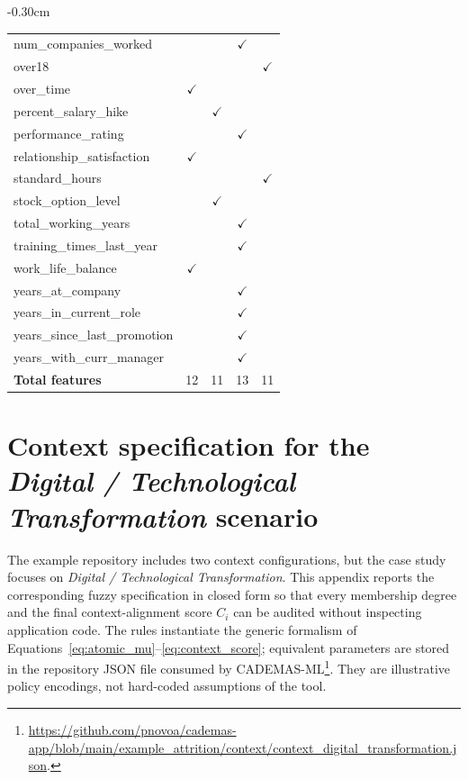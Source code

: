 \documentclass[journal,article,submit,pdftex,moreauthors,mathematics]{Definitions/mdpi}
\begin{document}
\begin{table}[H]
\begin{adjustwidth}{-0.3\extralength}{0cm}
\begin{tabularx}{1.1\textwidth}{l|cccc}
num\_companies\_worked &  &  & $\checkmark$ &  \\
over18 &  &  &  & $\checkmark$ \\
over\_time & $\checkmark$ &  &  &  \\
percent\_salary\_hike &  & $\checkmark$ &  &  \\
performance\_rating &  &  & $\checkmark$ &  \\
relationship\_satisfaction & $\checkmark$ &  &  &  \\
standard\_hours &  &  &  & $\checkmark$ \\
stock\_option\_level &  & $\checkmark$ &  &  \\
total\_working\_years &  &  & $\checkmark$ &  \\
training\_times\_last\_year &  &  & $\checkmark$ &  \\
work\_life\_balance & $\checkmark$ &  &  &  \\
years\_at\_company &  &  & $\checkmark$ &  \\
years\_in\_current\_role &  &  & $\checkmark$ &  \\
years\_since\_last\_promotion &  &  & $\checkmark$ &  \\
years\_with\_curr\_manager &  &  & $\checkmark$ &  \\
\midrule
\textbf{Total features} & 12 & 11 & 13 & 11 \\
\bottomrule
\end{tabularx}
\end{adjustwidth}
\end{table}

\section{Context specification for the \textit{Digital / Technological Transformation} scenario}\label{app:context_specs}

The example repository includes two context configurations, but the case study focuses on \textit{Digital / Technological Transformation}. This appendix reports the corresponding fuzzy specification in closed form so that every membership degree and the final context-alignment score $C_i$ can be audited without inspecting application code. The rules instantiate the generic formalism of Equations~\eqref{eq:atomic_mu}--\eqref{eq:context_score}; equivalent parameters are stored in the repository JSON file consumed by CADEMAS-ML\footnote{\url{https://github.com/pnovoa/cademas-app/blob/main/example_attrition/context/context_digital_transformation.json}.}. They are illustrative policy encodings, not hard-coded assumptions of the tool.
\end{document}
